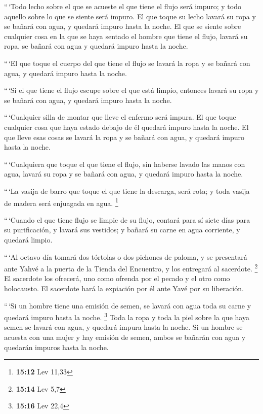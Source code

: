 \begin{paracol}{2}
 ``\,`Todo lecho sobre el que se acueste el que tiene el
flujo será impuro; y todo aquello sobre lo que se siente será impuro.
 El que toque su lecho lavará su ropa y se bañará con
agua, y quedará impuro hasta la noche.  El que se siente
sobre cualquier cosa en la que se haya sentado el hombre que tiene el
flujo, lavará su ropa, se bañará con agua y quedará impuro hasta la
noche.

 ``\,`El que toque el cuerpo del que tiene el flujo se
lavará la ropa y se bañará con agua, y quedará impuro hasta la noche.

 ``\,`Si el que tiene el flujo escupe sobre el que está
limpio, entonces lavará su ropa y se bañará con agua, y quedará impuro
hasta la noche.

 ``\,`Cualquier silla de montar que lleve el enfermo será
impura.  El que toque cualquier cosa que haya estado
debajo de él quedará impuro hasta la noche. El que lleve esas cosas se
lavará la ropa y se bañará con agua, y quedará impuro hasta la noche.

 ``\,`Cualquiera que toque el que tiene el flujo, sin
haberse lavado las manos con agua, lavará su ropa y se bañará con agua,
y quedará impuro hasta la noche.

 ``\,`La vasija de barro que toque el que tiene la
descarga, será rota; y toda vasija de madera será enjuagada en agua.
\footnote{\textbf{15:12} Lev 11,33}

 ``\,`Cuando el que tiene flujo se limpie de su flujo,
contará para sí siete días para su purificación, y lavará sus vestidos;
y bañará su carne en agua corriente, y quedará limpio.

 ``\,`Al octavo día tomará dos tórtolas o dos pichones de
paloma, y se presentará ante Yahvé a la puerta de la Tienda del
Encuentro, y los entregará al sacerdote. \footnote{\textbf{15:14} Lev
  5,7}  El sacerdote los ofrecerá, uno como ofrenda por
el pecado y el otro como holocausto. El sacerdote hará la expiación por
él ante Yavé por su liberación.

 ``\,`Si un hombre tiene una emisión de semen, se lavará
con agua toda su carne y quedará impuro hasta la noche. \footnote{\textbf{15:16}
  Lev 22,4}  Toda la ropa y toda la piel sobre la que
haya semen se lavará con agua, y quedará impura hasta la noche.
 Si un hombre se acuesta con una mujer y hay emisión de
semen, ambos se bañarán con agua y quedarán impuros hasta la noche.


\end{paracol}
